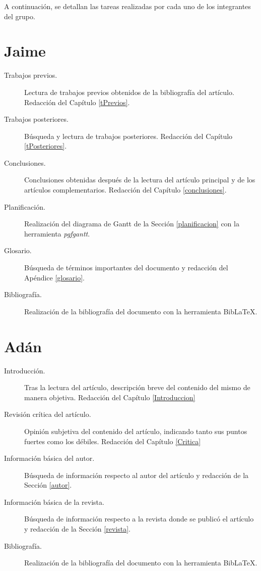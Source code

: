 \documentclass[a4paper,11pt]{report}
\begin{document}

A continuación, se detallan las tareas realizadas por cada uno de los integrantes del grupo.

\section*{Jaime}

\begin{description}
\item[Trabajos previos.] Lectura de trabajos previos obtenidos de la bibliografía del artículo. Redacción del Capítulo \ref{tPrevios}.
\item[Trabajos posteriores.] Búsqueda y lectura de trabajos posteriores. Redacción del Capítulo \ref{tPosteriores}.
\item[Conclusiones.] Conclusiones obtenidas después de la lectura del artículo principal y de los artículos complementarios. Redacción del Capítulo \ref{conclusiones}.
\item[Planificación.] Realización del diagrama de Gantt de la Sección \ref{planificacion} con la herramienta \emph{pgfgantt}.
\item[Glosario.] Búsqueda de términos importantes del documento y redacción del Apéndice \ref{glosario}.
\item[Bibliografía.] Realización de la bibliografía del documento con la herramienta Bib\LaTeX.
\end{description}

\section*{Adán}

\begin{description}
\item[Introducción.] Tras la lectura del artículo, descripción breve del contenido del mismo de manera objetiva. Redacción del Capítulo \ref{Introduccion}
\item[Revisión crítica del artículo.] Opinión subjetiva del contenido del artículo, indicando tanto sus puntos fuertes como los débiles. Redacción del Capítulo \ref{Critica}
\item[Información básica del autor.] Búsqueda de información respecto al autor del artículo y redacción de la Sección \ref{autor}. 
\item[Información básica de la revista.] Búsqueda de información respecto a la revista donde se publicó el  artículo y redacción de la Sección \ref{revista}. 
\item[Bibliografía.] Realización de la bibliografía del documento con la herramienta Bib\LaTeX.
\end{description}
\end{document}
